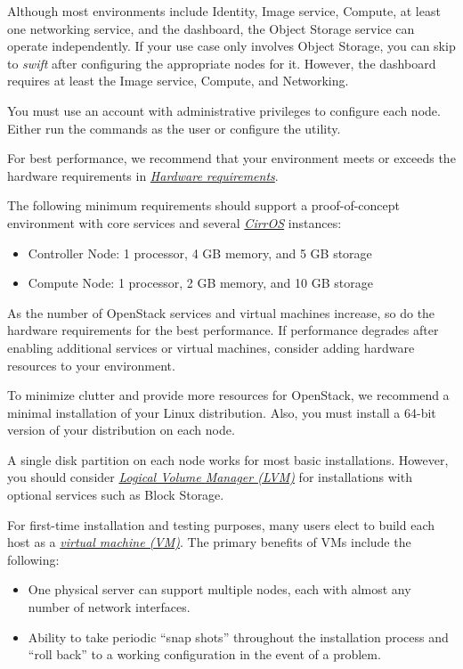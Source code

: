 \documentclass[letterpaper,10pt,english]{sphinxmanual}
\begin{document}
Although most environments include Identity, Image service, Compute, at least
one networking service, and the dashboard, the Object Storage service can
operate independently. If your use case only involves Object Storage, you can
skip to \emph{swift} after configuring the appropriate nodes for it. However,
the dashboard requires at least the Image service, Compute, and Networking.

You must use an account with administrative privileges to configure each node.
Either run the commands as the  user or configure the 
utility.

For best performance, we recommend that your environment meets or exceeds
the hardware requirements in {\hyperref[_source/installation_guide/overview:figure-hwreqs]{\emph{Hardware requirements}}}.

The following minimum requirements should support a proof-of-concept
environment with core services and several {\hyperref[_source/glossary:term-cirros]{\emph{CirrOS}}} instances:
\begin{itemize}
\item {} 
Controller Node: 1 processor, 4 GB memory, and 5 GB storage

\item {} 
Compute Node: 1 processor, 2 GB memory, and 10 GB storage

\end{itemize}

As the number of OpenStack services and virtual machines increase, so do the
hardware requirements for the best performance. If performance degrades after
enabling additional services or virtual machines, consider adding hardware
resources to your environment.

To minimize clutter and provide more resources for OpenStack, we recommend
a minimal installation of your Linux distribution. Also, you must install a
64-bit version of your distribution on each node.

A single disk partition on each node works for most basic installations.
However, you should consider {\hyperref[_source/glossary:term-logical-volume-manager-lvm]{\emph{Logical Volume Manager (LVM)}}} for
installations with optional services such as Block Storage.

For first-time installation and testing purposes, many users elect to build
each host as a {\hyperref[_source/glossary:term-virtual-machine-vm]{\emph{virtual machine (VM)}}}. The primary benefits of VMs
include the following:
\begin{itemize}
\item {} 
One physical server can support multiple nodes, each with almost any
number of network interfaces.

\item {} 
Ability to take periodic ``snap shots'' throughout the installation
process and ``roll back'' to a working configuration in the event of a
problem.

\end{itemize}
\end{document}
